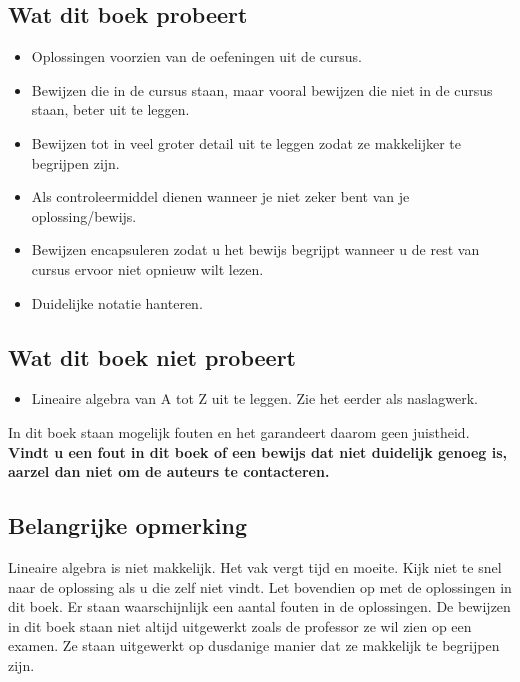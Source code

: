 \documentclass[lineaire_algebra_oplossingen.tex]{subfiles}
\begin{document}
\subsection*{Wat dit boek probeert}
\begin{itemize}
\item Oplossingen voorzien van de oefeningen uit de cursus.
\item Bewijzen die in de cursus staan, maar vooral bewijzen die niet in de cursus staan, beter uit te leggen.
\item Bewijzen tot in veel groter detail uit te leggen zodat ze makkelijker te begrijpen zijn. 
\item Als controleermiddel dienen wanneer je niet zeker bent van je oplossing/bewijs.
\item Bewijzen encapsuleren zodat u het bewijs begrijpt wanneer u de rest van cursus ervoor niet opnieuw wilt lezen. 
\item Duidelijke notatie hanteren.
\end{itemize}

\subsection*{Wat dit boek niet probeert}
\begin{itemize}
\item Lineaire algebra van A tot Z uit te leggen. Zie het eerder als naslagwerk.
\end{itemize}
In dit boek staan mogelijk fouten en het garandeert daarom geen juistheid.
\textbf{Vindt u een fout in dit boek of een bewijs dat niet duidelijk genoeg is, aarzel dan niet om de auteurs te contacteren.}

\subsection*{Belangrijke opmerking}
Lineaire algebra is niet makkelijk.
Het vak vergt tijd en moeite.
Kijk niet te snel naar de oplossing als u die zelf niet vindt.
Let bovendien op met de oplossingen in dit boek.
Er staan waarschijnlijk een aantal fouten in de oplossingen.
De bewijzen in dit boek staan niet altijd uitgewerkt zoals de professor ze wil zien op een examen.
Ze staan uitgewerkt op dusdanige manier dat ze makkelijk te begrijpen zijn.
\end{document}
